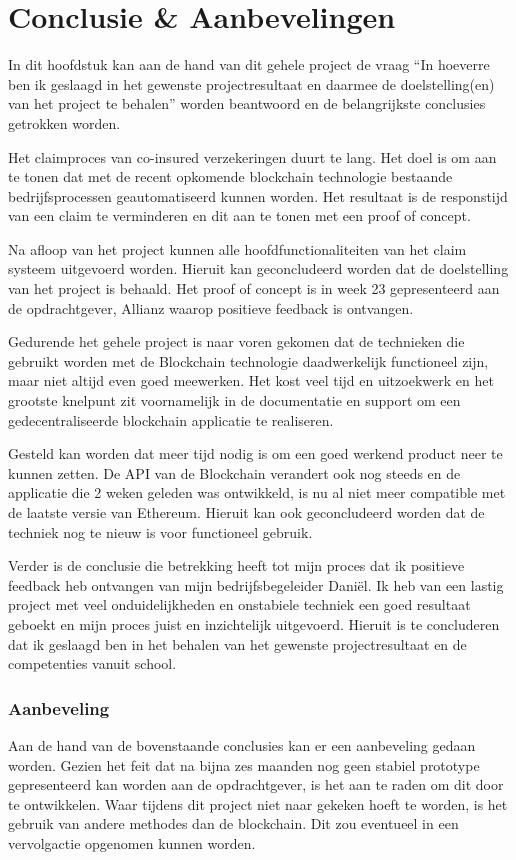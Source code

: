 \chapter{Conclusie \& Aanbevelingen}
In dit hoofdstuk kan aan de hand van dit gehele project de vraag “In hoeverre ben ik geslaagd in het gewenste projectresultaat en daarmee de doelstelling(en) van het project te behalen” worden beantwoord en de belangrijkste conclusies getrokken worden.

Het claimproces van co-insured verzekeringen duurt te lang. Het doel is om aan te tonen dat met de recent opkomende blockchain technologie bestaande bedrijfsprocessen geautomatiseerd kunnen worden. Het resultaat is de responstijd van een claim te verminderen en dit aan te tonen met een proof of concept.

Na afloop van het project kunnen alle hoofdfunctionaliteiten van het claim systeem uitgevoerd worden. Hieruit kan geconcludeerd worden dat de doelstelling van het project is behaald. Het proof of concept is in week 23 gepresenteerd aan de opdrachtgever, Allianz waarop positieve feedback is ontvangen.

Gedurende het gehele project is naar voren gekomen dat de technieken die gebruikt worden met de Blockchain technologie daadwerkelijk functioneel zijn, maar niet altijd even goed meewerken. Het kost veel tijd en uitzoekwerk en het grootste knelpunt zit voornamelijk in de documentatie en support om een gedecentraliseerde blockchain applicatie te realiseren.

Gesteld kan worden dat meer tijd nodig is om een goed werkend product neer te kunnen zetten. De API van de Blockchain verandert ook nog steeds en de applicatie die 2 weken geleden was ontwikkeld, is nu al niet meer compatible met de laatste versie van Ethereum. Hieruit kan ook geconcludeerd worden dat de techniek nog te nieuw is voor functioneel gebruik.

Verder is de conclusie die betrekking heeft tot mijn proces dat ik positieve feedback heb ontvangen van mijn bedrijfsbegeleider Daniël. Ik heb van een lastig project met veel onduidelijkheden en onstabiele techniek een goed resultaat geboekt en mijn proces juist en inzichtelijk uitgevoerd. Hieruit is te concluderen dat ik geslaagd ben in het behalen van het gewenste projectresultaat en de competenties vanuit school. 

\subsection{Aanbeveling}
Aan de hand van de bovenstaande conclusies kan er een aanbeveling gedaan worden. Gezien het feit dat na bijna zes maanden nog geen stabiel prototype gepresenteerd kan worden aan de opdrachtgever, is het aan te raden om dit door te ontwikkelen. Waar tijdens dit project niet naar gekeken hoeft te worden, is het gebruik van andere methodes dan de blockchain. Dit zou eventueel in een vervolgactie opgenomen kunnen worden.